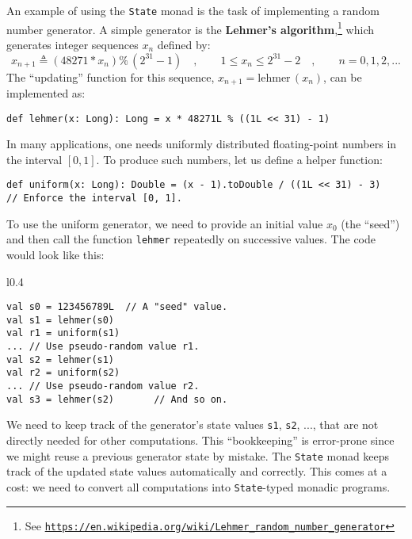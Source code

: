 An example of using the \lstinline!State! monad is the task of implementing
a random number generator. A simple generator is the \textbf{Lehmer\textsf{'}s
algorithm},\footnote{See \texttt{\href{https://en.wikipedia.org/wiki/Lehmer_random_number_generator}{https://en.wikipedia.org/wiki/Lehmer\_random\_number\_generator}}}
which generates integer sequences $x_{n}$ defined by:
\[
x_{n+1}\triangleq\left(48271*x_{n}\right)\%\,(2^{31}-1)\quad,\quad\quad1\leq x_{n}\leq2^{31}-2\quad,\quad\quad n=0,1,2,...
\]
The \textsf{``}updating\textsf{''} function for this sequence, $x_{n+1}=\text{lehmer}\,(x_{n})$,
can be implemented as:
\begin{lstlisting}
def lehmer(x: Long): Long = x * 48271L % ((1L << 31) - 1)
\end{lstlisting}
In many applications, one needs uniformly distributed floating-point
numbers in the interval $\left[0,1\right]$. To produce such numbers,
let us define a helper function:
\begin{lstlisting}
def uniform(x: Long): Double = (x - 1).toDouble / ((1L << 31) - 3)   // Enforce the interval [0, 1].
\end{lstlisting}

To use the uniform generator, we need to provide an initial value
$x_{0}$ (the \textsf{``}seed\textsf{''}) and then call the function \lstinline!lehmer!
repeatedly on successive values. The code would look like this:

\begin{wrapfigure}{l}{0.4\columnwidth}%
\vspace{-0.8\baselineskip}
\begin{lstlisting}
val s0 = 123456789L  // A "seed" value.
val s1 = lehmer(s0)
val r1 = uniform(s1)
... // Use pseudo-random value r1.
val s2 = lehmer(s1)
val r2 = uniform(s2)
... // Use pseudo-random value r2.
val s3 = lehmer(s2)       // And so on.
\end{lstlisting}

\vspace{-1\baselineskip}
\end{wrapfigure}%

\noindent We need to keep track of the generator\textsf{'}s state values \lstinline!s1!,
\lstinline!s2!, ..., that are not directly needed for other computations.
This \textsf{``}bookkeeping\textsf{''} is error-prone since we might reuse a previous
generator state by mistake. The \lstinline!State! monad keeps track
of the updated state values automatically and correctly. This comes
at a cost: we need to convert all computations into \lstinline!State!-typed
monadic programs.

